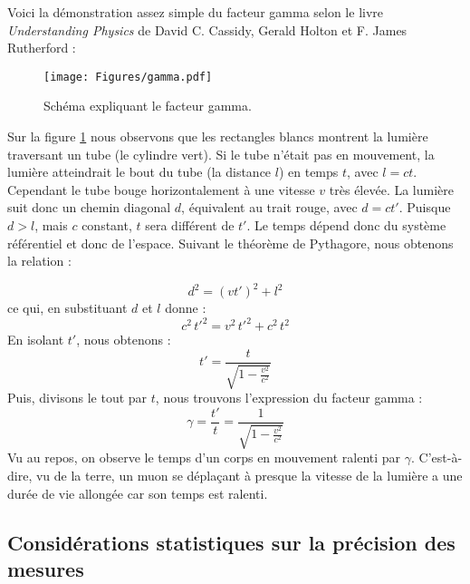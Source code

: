 \documentclass[a4paper, 12pt]{article}
\begin{document}
\begin{spacing}{1.5}
Voici la démonstration assez simple du facteur gamma selon le livre \emph{Understanding Physics} de David C. Cassidy, Gerald Holton et F. James Rutherford :

\begin{figure}[t]
\begin{center}
\texttt{[image: Figures/gamma.pdf]}
\caption{\label{fig:SSgamma} Schéma expliquant le facteur gamma.}
\end{center}
\end{figure}

Sur la figure \ref{fig:SSgamma} nous observons que les rectangles blancs montrent la lumière traversant un tube (le cylindre vert). Si le tube n'était pas en mouvement, la lumière atteindrait le bout du tube (la distance $l$) en temps $t$, avec $l = ct$. Cependant le tube bouge horizontalement à une vitesse $v$ très élevée. La lumière suit donc un chemin diagonal $d$, équivalent au trait rouge, avec $d = ct'$. Puisque $d>l$, mais $c$ constant, $t$ sera différent de $t'$. Le temps dépend donc du système référentiel et donc de l'espace. Suivant le théorème de Pythagore, nous obtenons la relation :

\begin{equation}
d^2 = (vt')^2 +  l^2 \label{eq:gammaA}
\end{equation}
ce qui, en substituant $d$ et $l$ donne :
\begin{equation}
c^2\,t'^2 = v^2\,t'^2 +c^2\,t^2 \label{eq:gammaB}
\end{equation}
En isolant $t'$, nous obtenons :
\begin{equation}
t' = \frac{t}{\sqrt{1-\frac{v^2}{c^2}}} \label{eq:gammaC}
\end{equation}
Puis, divisons le tout par $t$, nous trouvons l'expression du facteur gamma :
\begin{equation}
\gamma = \frac{t'}{t} = \frac{1}{\sqrt{1-\frac{v^2}{c^2}}} \label{eq:gammaF}
\end{equation}
Vu au repos, on observe le temps d'un corps en mouvement ralenti par $\gamma$. C'est-à-dire, vu de la terre, un muon se déplaçant à presque la vitesse de la lumière a une durée de vie allongée car son temps est ralenti. 

\subsection{Considérations statistiques sur la précision des mesures}
\label{sec:sigma}


\end{spacing}
\end{document}
